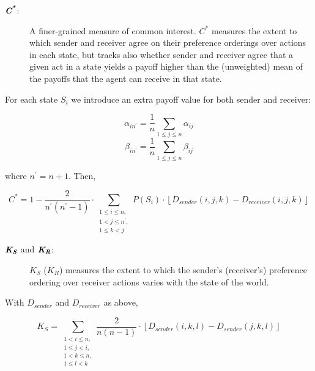\documentclass{article}
\def\mathbi#1{\textbf{\em #1}} %
\begin{document}
\begin{description}
    \item[$\mathbi{C}^\mathbi{*}$:]
A finer-grained measure of common interest. $C^*$
measures the extent to which sender and receiver agree on their
preference orderings over actions in each state, but tracks also whether
sender and receiver agree that a given act in a state yields a payoff
higher than the (unweighted) mean of the payoffs that the agent can
receive in that state.
\end{description}

For each state $S_{i}$ we introduce an extra payoff value for both
sender and receiver:

\[\alpha_{in^\prime} = \frac{1}{n}\sum\limits_{1 \leq j \leq n} \alpha_{ij}\]
\[\beta_{in^\prime} = \frac{1}{n}\sum\limits_{1 \leq j \leq n} \beta_{ij}\]

where $n^\prime = n + 1$. Then,

\[C^* = 1 - \frac{2}{n^\prime(n^\prime-1)}\cdot \sum\limits_{\substack{1 \leq i \leq n, \\ 1 < j \leq n^\prime, \\ 1 \leq k < j}} P\left(S_{i}\right)\cdot\left\lfloor D_{sender}(i, j, k) - D_{receiver}(i,j,k)\right\rfloor\]

\begin{description}
    \item[$\mathbi{K}_\mathbi{S}$ and $\mathbi{K}_\mathbi{R}$:]
$K_S$ ($K_R$) measures the extent to
which the sender's (receiver's) preference ordering over receiver actions 
varies with the state of the world.
\end{description}

With $D_{sender}$ and $D_{receiver}$ as above,

\[K_{S} = \sum\limits_{\substack{1 < i \leq n, \\ 1 \leq j < i, \\ 1 < k \leq n, \\ 1 \leq l < k}} \frac{2}{n(n-1)}\cdot\left\lfloor D_{sender}(i, k, l) - D_{sender}(j,k,l)\right\rfloor\]
\end{document}
